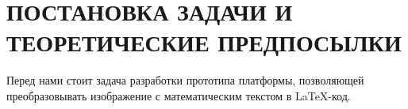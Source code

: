 \section{ПОСТАНОВКА ЗАДАЧИ И ТЕОРЕТИЧЕСКИЕ ПРЕДПОСЫЛКИ}

Перед нами стоит задача разработки прототипа платформы, позволяющей преобразовывать изображение с математическим текстом в \LaTeX-код.


